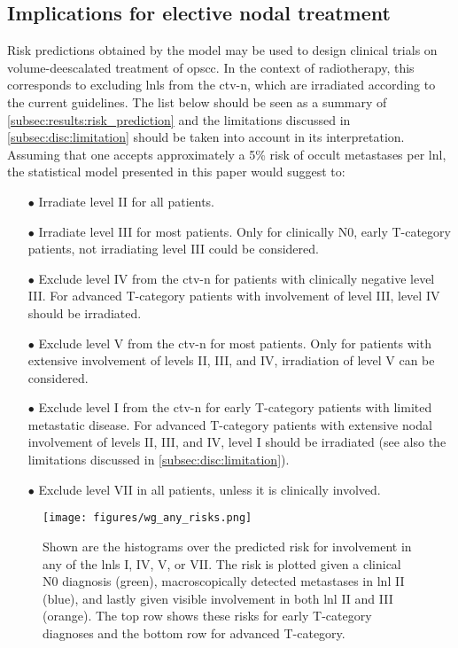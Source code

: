 \documentclass[twocolumn]{aastex631}
\begin{document}
\subsection{Implications for elective nodal treatment} 
Risk predictions obtained by the model may be used to design clinical trials on volume-deescalated treatment of \gls{opscc}. In the context of radiotherapy, this corresponds to excluding \glspl{lnl} from the \gls{ctv-n}, which are irradiated according to the current guidelines. The list below should be seen as a summary of \autoref{subsec:results:risk_prediction} and the limitations discussed in \autoref{subsec:disc:limitation} should be taken into account in its interpretation. Assuming that one accepts approximately a 5\% risk of occult metastases per \gls{lnl}, the statistical model presented in this paper would suggest to:
\begin{itemize}
    \item[$\bullet$] Irradiate level II for all patients.
    \item[$\bullet$] Irradiate level III for most patients. Only for clinically N0, early T-category patients, not irradiating level III could be considered. 
    \item[$\bullet$] Exclude level IV from the \gls{ctv-n} for patients with clinically negative level III. For advanced T-category patients with involvement of level III, level IV should be irradiated.
    \item[$\bullet$] Exclude level V from the \gls{ctv-n} for most patients. Only for patients with extensive involvement of levels II, III, and IV, irradiation of level V can be considered.
    \item[$\bullet$] Exclude level I from the \gls{ctv-n} for early T-category patients with limited metastatic disease. For advanced T-category patients with extensive nodal involvement of levels II, III, and IV, level I should be irradiated (see also the limitations discussed in \autoref{subsec:disc:limitation}).
    \item[$\bullet$] Exclude level VII in all patients, unless it is clinically involved.
\end{itemize}

\begin{figure}[b]
    \begin{centering}
        \texttt{[image: figures/wg\_any\_risks.png]}
        \caption{Shown are the histograms over the predicted risk for involvement in any of the \glspl{lnl} I, IV, V, or VII. The risk is plotted given a clinical N0 diagnosis (green), macroscopically detected metastases in \gls{lnl} II (blue), and lastly given visible involvement in both \gls{lnl} II and III (orange). The top row shows these risks for early T-category diagnoses and the bottom row for advanced T-category. \label{fig:wg_any_risks}}
    \end{centering}
\end{figure}
\end{document}
